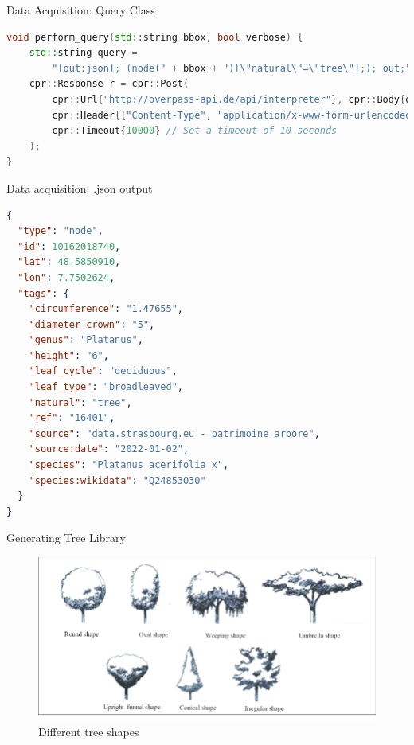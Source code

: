 \documentclass[10pt]{beamer}
\begin{document}
\begin{frame}[fragile]{Data Acquisition: Query Class}
	\begin{lstlisting}[language=C++]
void perform_query(std::string bbox, bool verbose) {
	std::string query =
		"[out:json]; (node(" + bbox + ")[\"natural\"=\"tree\"];); out;";
	cpr::Response r = cpr::Post(
		cpr::Url{"http://overpass-api.de/api/interpreter"}, cpr::Body{query},
		cpr::Header{{"Content-Type", "application/x-www-form-urlencoded"}},
		cpr::Timeout{10000} // Set a timeout of 10 seconds
	);
}
	\end{lstlisting}
\end{frame}

\begin{frame}[fragile]{Data acquisition: .json output}
	\begin{lstlisting}[language=json]
{
  "type": "node",
  "id": 10162018740,
  "lat": 48.5850910,
  "lon": 7.7502624,
  "tags": {
	"circumference": "1.47655",
	"diameter_crown": "5",
	"genus": "Platanus",
	"height": "6",
	"leaf_cycle": "deciduous",
	"leaf_type": "broadleaved",
	"natural": "tree",
	"ref": "16401",
	"source": "data.strasbourg.eu - patrimoine_arbore",
	"source:date": "2022-01-02",
	"species": "Platanus acerifolia x",
	"species:wikidata": "Q24853030"
  }
}
	\end{lstlisting}
\end{frame}

\begin{frame}{Generating Tree Library}
	\begin{figure}
		\centering
		\includegraphics[width=\textwidth]{images/Different-types-of-the-trees-shape.png}
		\caption{Different tree shapes}
		\label{fig:figure1}
	\end{figure}
\end{frame}
\end{document}
